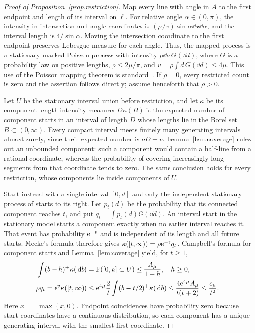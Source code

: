 \documentclass[11pt,letterpaper]{article}
\begin{document}
\begin{proof}[Proof of Proposition~\ref{prop:restriction}]
Map every line with angle in $A$ to the first endpoint and length of its interval on $\ell$. For relative angle $\alpha\in(0,\pi)$, the intensity in intersection and angle coordinates is $(\mu/\pi)\sin\alpha\dd x\dd\alpha$, and the interval length is $4/\sin\alpha$. Moving the intersection coordinate to the first endpoint preserves Lebesgue measure for each angle. Thus, the mapped process is a stationary marked Poisson process with intensity $\rho\dd a\,G(\dd d)$, where $G$ is a probability law on positive lengths, $\rho\le2\mu/\pi$, and $v=\rho\int d\,G(\dd d)\le4\mu$. This use of the Poisson mapping theorem is standard~\cite[Section~5.1]{LP17}. If $\rho=0$, every restricted count is zero and the assertion follows directly; assume henceforth that $\rho>0$.

Let $U$ be the stationary interval union before restriction, and let $\kappa$ be its component-length intensity measure: $D\kappa(B)$ is the expected number of component starts in an interval of length $D$ whose lengths lie in the Borel set $B\subset(0,\infty)$. Every compact interval meets finitely many generating intervals almost surely, since their expected number is $\rho D+v$. Lemma~\ref{lem:coverage} rules out an unbounded component: such a component would contain a half-line from a rational coordinate, whereas the probability of covering increasingly long segments from that coordinate tends to zero. The same conclusion holds for every restriction, whose components lie inside components of $U$.

Start instead with a single interval $[0,d]$ and only the independent stationary process of starts to its right. Let $p_t(d)$ be the probability that its connected component reaches $t$, and put $q_t=\int p_t(d)G(\dd d)$. An interval start in the stationary model starts a component exactly when no earlier interval reaches it. That event has probability $\mathrm{e}^{-v}$ and is independent of its length and all future starts. Mecke's formula therefore gives $\kappa([t,\infty))=\rho\mathrm{e}^{-v}q_t$. Campbell's formula for component starts and Lemma~\ref{lem:coverage} yield, for $t\ge1$,
\begin{equation}\label{eq:q}
\begin{aligned}
 \int(b-h)^+\kappa(\,\mathrm{d} b)&=\mathbb P([0,h]\subset U)
                                   \le\frac{A_\mu}{1+h},\quad h\ge0,\\
 \rho q_t=\mathrm{e}^v\kappa([t,\infty))
   &\le\mathrm{e}^{4\mu}\frac2t\int(b-t/2)^+\kappa(\,\mathrm{d} b)
    \le\frac{4\mathrm{e}^{4\mu}A_\mu}{t(t+2)}\le\frac{c_\mu}{t^2}.
\end{aligned}
\end{equation}
Here $x^+=\max(x,0)$. Endpoint coincidences have probability zero because start coordinates have a continuous distribution, so each component has a unique generating interval with the smallest first coordinate.


\end{proof}
\end{document}
